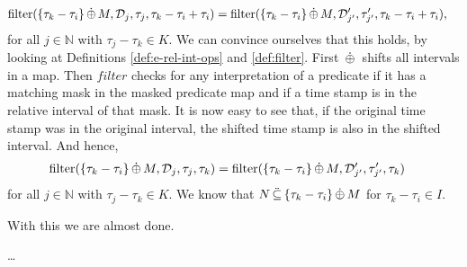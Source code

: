 \begin{align*}
    \operatorname{filter}(\{ \tau_k - \tau_i \} \,\dot{\oplus}\, M, \mathcal{D}_j, \tau_j, \tau_k - \tau_i + \tau_i)
    &= \operatorname{filter}(\{ \tau_k - \tau_i \} \,\dot{\oplus}\, M, \mathcal{D}'_{j'}, \tau'_{j'}, \tau_k - \tau_i + \tau_i), 
\end{align*}
for all $j \in \mathbb{N}$ with $\tau_j - \tau_k \in K$.
We can convince ourselves that this holds, by looking at Definitions \ref{def:e-rel-int-ops} and \ref{def:filter}.
First $\,\dot{\oplus}\,$ shifts all intervals in a map.
Then $filter$ checks for any interpretation of a predicate if it has a matching mask in the masked predicate map and if a time stamp is in the relative interval of that mask.
It is now easy to see that, if the original time stamp was in the original interval, the shifted time stamp is also in the shifted interval.
And hence,
\begin{align*}
    \operatorname{filter}(\{ \tau_k - \tau_i \} \,\dot{\oplus}\, M, \mathcal{D}_j, \tau_j, \tau_k)
    &= \operatorname{filter}(\{ \tau_k - \tau_i \} \,\dot{\oplus}\, M, \mathcal{D}'_{j'}, \tau'_{j'}, \tau_k) 
\end{align*}
for all $j \in \mathbb{N}$ with $\tau_j - \tau_k \in K$.
We know that $N \,\ddot{\subseteq}\, \{\tau_k - \tau_i \} \,\dot{\oplus}\, M$ for $\tau_k - \tau_i \in I$.


With this we are almost done.





\dots


